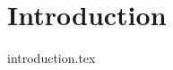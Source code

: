 \documentclass[oneside]{report}
\begin{document}
	\tableofcontents
	\listoffigures
	\clearpage
{}

	\section{Introduction}
	{introduction.tex}
	
\end{document}

